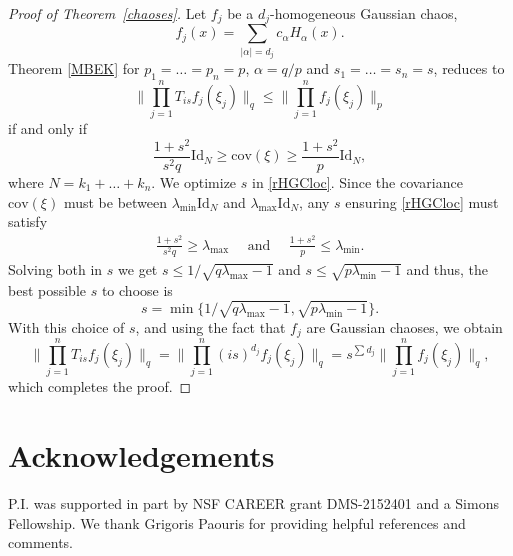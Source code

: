 \documentclass[9pt, a4paper]{amsart}
\newcommand{\1}{{\chi_{}}}%
\numberwithin{equation}{section}
\begin{document}
\begin{proof}[Proof of Theorem~\ref{chaoses}]
Let $f_j$ be a $d_j$-homogeneous Gaussian chaos,
\begin{equation*}
f_j(x)=\sum_{|\alpha|=d_j}c_{\alpha}H_{\alpha}(x).
\end{equation*}
Theorem \ref{MBEK} for $p_1=\ldots=p_n=p$, $\alpha=q/p$ and $s_1=\ldots=s_n=s$, reduces to  
\begin{equation*}
\| \prod_{j=1}^n T_{is}f_j(\xi_j)\|_q\leq \| \prod_{j=1}^n f_j(\xi_j)\|_p
\end{equation*}
if and only if
\begin{equation}\label{rHGCloc}
 \frac{1+s^{2}}{s^{2}q} \mathrm{Id}_{N}  \geq \mathrm{cov}(\xi) \geq  \frac{1+s^{2}}{p}\mathrm{Id}_{N} ,
\end{equation}
where $N=k_{1}+\ldots+k_{n}$. We optimize $s$ in \eqref{rHGCloc}. Since the covariance $\mathrm{cov}(\xi)$ must be between  $\lambda_{\min}\mathrm{Id}_{N}$ and $\lambda_{\max}\mathrm{Id}_{N}$, any $s$ ensuring \ref{rHGCloc} must satisfy 
\begin{align*}
\frac{1+s^2}{s^2 q}\geq \lambda_{\max} \ \ \ \ \ \  \text{and} \ \ \ \ \ \ \frac{1+s^2}{p}\leq \lambda_{\min} . 
\end{align*}
Solving both in $s$ we get $s\leq 1/\sqrt{q\lambda_{\max}-1}$ and $s\leq \sqrt{p\lambda_{\min}-1}$ and thus, the best possible $s$ to choose is
\begin{equation*}
s=\min \{ 1/\sqrt{q\lambda_{\max}-1}, \sqrt{p\lambda_{\min}-1} \}.
\end{equation*}
With this choice of $s$, and using the fact that $f_j$ are Gaussian chaoses, we obtain
\begin{equation*}
\| \prod_{j=1}^n T_{is}f_j(\xi_j)\|_q= \| \prod_{j=1}^n (is)^{d_j}f_j(\xi_j)\|_q= s^{\sum d_j}\| \prod_{j=1}^n f_j(\xi_j)\|_q,
\end{equation*}
which completes the proof.
\end{proof}



	
    

 
	\section*{\textbf{Acknowledgements}}
	P.I. was supported in part by NSF CAREER grant DMS-2152401 and a Simons Fellowship. We thank Grigoris Paouris for providing helpful references and comments.
	
\end{document}

